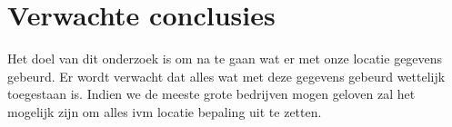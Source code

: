 \section{Verwachte conclusies}
\label{sec:verwachte_conclusies}
Het doel van dit onderzoek is om na te gaan wat er met onze locatie gegevens gebeurd. 
Er wordt verwacht dat alles wat met deze gegevens gebeurd wettelijk toegestaan is.
Indien we de meeste grote bedrijven mogen geloven zal het mogelijk zijn om alles ivm locatie bepaling uit te zetten.


